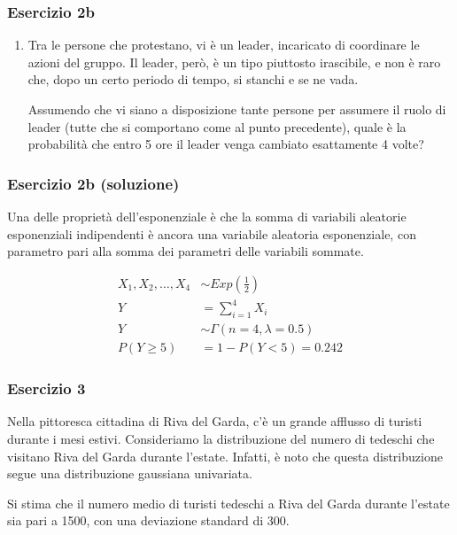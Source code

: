 \documentclass{beamer}
\begin{document}
\begin{frame}[fragile]
	\frametitle{Esercizio 2b}

	\begin{enumerate}[b]
		\item Tra le persone che protestano, vi è un leader, incaricato di coordinare le azioni del gruppo. Il leader, però, è un tipo piuttosto irascibile, e non è raro che, dopo un certo periodo di tempo, si stanchi e se ne vada.
		
		Assumendo che vi siano a disposizione tante persone per assumere il ruolo di leader (tutte che si comportano come al punto precedente), quale è la probabilità che entro 5 ore il leader venga cambiato esattamente 4 volte?
	\end{enumerate}
\end{frame}


\begin{frame}[fragile]
	\frametitle{Esercizio 2b (soluzione)}

	Una delle proprietà dell'esponenziale è che la somma di variabili aleatorie esponenziali indipendenti è ancora una variabile aleatoria esponenziale, con parametro pari alla somma dei parametri delle variabili sommate.

	\begin{align*}
		X_1, X_2, \dots, X_{4} & \sim Exp(\frac{1}{2}) \\
		Y & = \sum_{i=1}^{4} X_i \\
		Y & \sim \Gamma(n = 4, \lambda = 0.5) \\
		P(Y \ge 5) & = 1 - P(Y < 5) = 0.242
	\end{align*}

\end{frame}

\begin{frame}[fragile]
	\frametitle{Esercizio 3}
	Nella pittoresca cittadina di Riva del Garda, c'è un grande afflusso di turisti durante i mesi estivi. Consideriamo la distribuzione del numero di tedeschi che visitano Riva del Garda durante l'estate. Infatti, è noto che questa distribuzione segue una distribuzione gaussiana univariata.

	\medskip

	Si stima che il numero medio di turisti tedeschi a Riva del Garda durante l'estate sia pari a 1500, con una deviazione standard di 300.
\end{frame}
\end{document}
